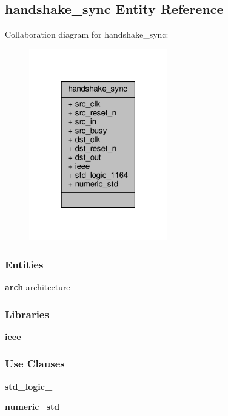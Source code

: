 \subsection{handshake\+\_\+sync Entity Reference}
\label{classhandshake__sync}


Collaboration diagram for handshake\+\_\+sync\+:\nopagebreak
\begin{figure}[H]
\begin{center}
\leavevmode
\includegraphics[width=171pt]{d1/d1c/classhandshake__sync__coll__graph}
\end{center}
\end{figure}
\subsubsection*{Entities}
\begin{DoxyCompactItemize}
\item 
{\bf arch} architecture
\end{DoxyCompactItemize}
\subsubsection*{Libraries}
 \begin{DoxyCompactItemize}
\item 
{\bf ieee} 
\end{DoxyCompactItemize}
\subsubsection*{Use Clauses}
 \begin{DoxyCompactItemize}
\item 
{\bf std\+\_\+logic\+\_}   
\item 
{\bf numeric\+\_\+std}   
\end{DoxyCompactItemize}
